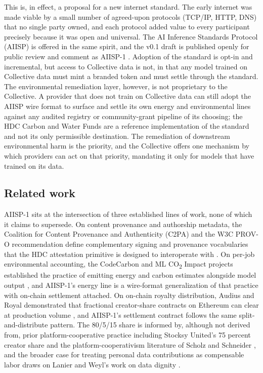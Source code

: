\documentclass[10pt,a4paper,twocolumn]{article}
\begin{document}
This is, in effect, a proposal for a new internet standard. The early internet was made viable by a small number of agreed-upon protocols (TCP/IP, HTTP, DNS) that no single party owned, and each protocol added value to every participant precisely because it was open and universal. The AI Inference Standards Protocol (AIISP) is offered in the same spirit, and the v0.1 draft is published openly for public review and comment as AIISP-1 \citep{aiisp1spec2026}. Adoption of the standard is opt-in and incremental, but access to Collective data is not, in that any model trained on Collective data must mint a branded token and must settle through the standard. The environmental remediation layer, however, is not proprietary to the Collective. A provider that does not train on Collective data can still adopt the AIISP wire format to surface and settle its own energy and environmental lines against any audited registry or community-grant pipeline of its choosing; the HDC Carbon and Water Funds are a reference implementation of the standard and not its only permissible destination. The remediation of downstream environmental harm is the priority, and the Collective offers one mechanism by which providers can act on that priority, mandating it only for models that have trained on its data.

\subsection*{Related work}

AIISP-1 sits at the intersection of three established lines of work, none of which it claims to supersede. On content provenance and authorship metadata, the Coalition for Content Provenance and Authenticity (C2PA) and the W3C PROV-O recommendation define complementary signing and provenance vocabularies that the HDC attestation primitive is designed to interoperate with \citep{c2pa2024spec,w3c2013provo}. On per-job environmental accounting, the CodeCarbon and ML CO\textsubscript{2} Impact projects established the practice of emitting energy and carbon estimates alongside model output \citep{codecarbon2024,lacoste2019mlco2}, and AIISP-1's energy line is a wire-format generalization of that practice with on-chain settlement attached. On on-chain royalty distribution, Audius and Royal demonstrated that fractional creator-share contracts on Ethereum can clear at production volume \citep{audius2018whitepaper,royal2021}, and AIISP-1's settlement contract follows the same split-and-distribute pattern. The 80/5/15 share is informed by, although not derived from, prior platform-cooperative practice including Stocksy United's 75 percent creator share and the platform-cooperativism literature of Scholz and Schneider \citep{scholz2016platform,schneider2018everything}, and the broader case for treating personal data contributions as compensable labor draws on Lanier and Weyl's work on data dignity \citep{lanier2018dignity}.
\end{document}
